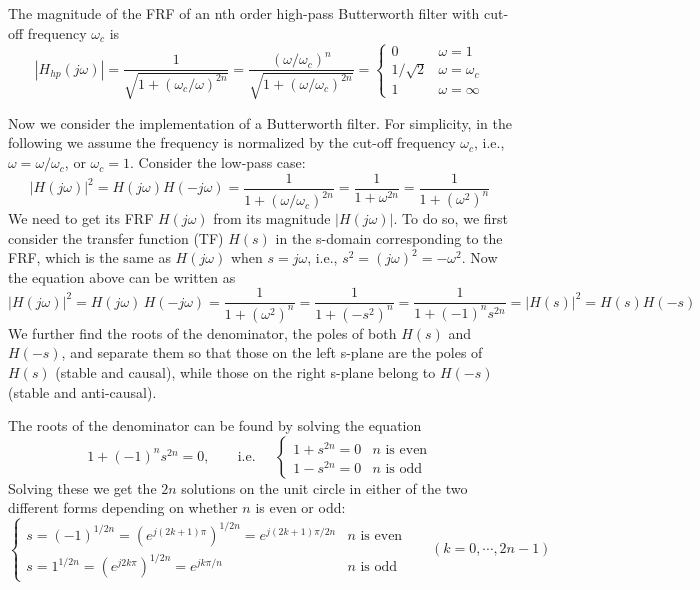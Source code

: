 \documentclass{article}
\begin{document}
  The magnitude of the FRF of an nth order high-pass Butterworth  filter 
  with cut-off frequency $\omega_c$ is
  \begin{equation}
  \left| H_{hp}(j\omega)\right|=\frac{1}{\sqrt{1+(\omega_c/\omega)^{2n}}}
  =\frac{(\omega/\omega_c)^n}{\sqrt{1+(\omega/\omega_c)^{2n}}}
  =\left\{\begin{array}{ll}0 & \omega=1\\1/\sqrt{2}&\omega=\omega_c\\
  1 & \omega=\infty\end{array}\right.
  \end{equation}


  Now we consider the implementation of a Butterworth filter. For 
  simplicity, in the following we assume the frequency is normalized 
  by the cut-off frequency $\omega_c$, i.e., $\omega=\omega/\omega_c$, 
  or $\omega_c=1$. Consider the low-pass case:
  \begin{equation}
  |H(j\omega)|^2=H(j\omega)H(-j\omega)
  =\frac{1}{1+(\omega/\omega_c)^{2n}}
  =\frac{1}{1+\omega^{2n}}=\frac{1}{1+(\omega^2)^n}
  \end{equation}
  We need to get its FRF $H(j\omega)$ from its magnitude $|H(j\omega)|$.
  To do so, we first consider the transfer function (TF) $H(s)$ in the 
  s-domain corresponding to the FRF, which is the same as $H(j\omega)$ 
  when $s=j\omega$, i.e., $s^2=(j\omega)^2=-\omega^2$. Now the equation 
  above can be written as
  \begin{equation}
  |H(j\omega)|^2=H(j\omega)\,H(-j\omega)
  =\frac{1}{1+(\omega^2)^n}=\frac{1}{1+(-s^2)^n}
  =\frac{1}{1+(-1)^ns^{2n}}=|H(s)|^2=H(s) H(-s)
  \end{equation}
  We further find the roots of the denominator, the poles of both $H(s)$
  and $H(-s)$, and separate them so that those on the left s-plane are 
  the poles of $H(s)$ (stable and causal), while those on the right 
  s-plane belong to $H(-s)$ (stable and anti-causal).

  The roots of the denominator can be found by solving the equation
  \begin{equation}
  1+(-1)^ns^{2n}=0,\;\;\;\;\;\;\;\mbox{i.e.}\;\;\;\;\;
  \left\{\begin{array}{ll}
  1+s^{2n}=0 & \mbox{$n$ is even}\\
  1-s^{2n}=0 & \mbox{$n$ is odd}\end{array}\right.
  \end{equation}
  Solving these we get the $2n$ solutions on the unit circle in
  either of the two different forms depending on whether $n$ is even 
  or odd:
  \begin{equation}
  \left\{\begin{array}{ll}
  s=(-1)^{1/2n}=(e^{j(2k+1)\pi})^{1/2n}=e^{j(2k+1)\pi/2n} & \mbox{$n$ is even}\\
  s=1^{1/2n}=(e^{j2k\pi})^{1/2n}=e^{jk\pi/n} & \mbox{$n$ is odd}
  \end{array}\right.\;\;\;\;\;\;(k=0,\cdots,2n-1)
  \end{equation}
\end{document}
